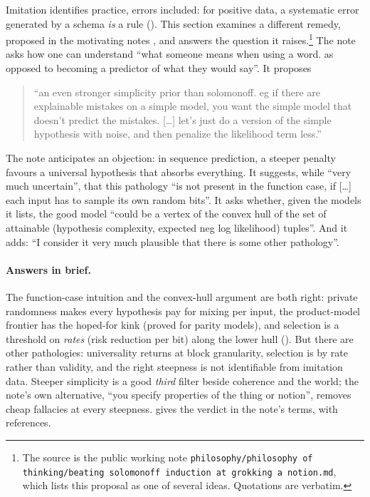 Imitation identifies practice, errors included: for positive data, a systematic error generated by a schema \emph{is} a rule (). This section examines a different remedy, proposed in the motivating notes \citep{hanni2026notes}, and answers the question it raises.\footnote{The source is the public working note \texttt{philosophy/\allowbreak philosophy of thinking/\allowbreak beating solomonoff induction at grokking a notion.md}, which lists this proposal as one of several ideas. Quotations are verbatim.} The note asks how one can understand ``what someone means when using a word. as opposed to becoming a predictor of what they would say''. It proposes
\begin{quote}\small
``an even stronger simplicity prior than solomonoff. eg if there are explainable mistakes on a simple model, you want the simple model that doesn't predict the mistakes. [\dots] let's just do a version of the simple hypothesis with noise, and then penalize the likelihood term less.''
\end{quote}
The note anticipates an objection: in sequence prediction, a steeper penalty favours a universal hypothesis that absorbs everything. It suggests, while ``very much uncertain'', that this pathology ``is not present in the function case, if [\dots] each input has to sample its own random bits''. It asks whether, given the models it lists, the good model ``could be a vertex of the convex hull of the set of attainable (hypothesis complexity, expected neg log likelihood) tuples''. And it adds: ``I consider it very much plausible that there is some other pathology''.

\paragraph{Answers in brief.} The function-case intuition and the convex-hull argument are both right: private randomness makes every hypothesis pay for mixing per input, the product-model frontier has the hoped-for kink (proved for parity models), and selection is a threshold on \emph{rates} (risk reduction per bit) along the lower hull (). But there are other pathologies: universality returns at block granularity, selection is by rate rather than validity, and the right steepness is not identifiable from imitation data. Steeper simplicity is a good \emph{third} filter beside coherence and the world; the note's own alternative, ``you specify properties of the thing or notion'', removes cheap fallacies at every steepness.  gives the verdict in the note's terms, with references.

